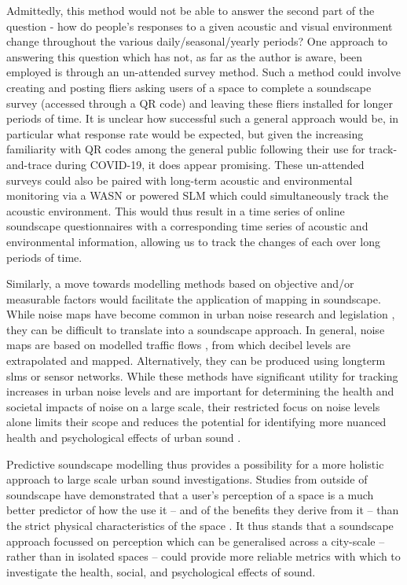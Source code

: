 Admittedly, this method would not be able to answer the second part of the question - how do people's responses to a given acoustic and visual environment change throughout the various daily/seasonal/yearly periods? One approach to answering this question which has not, as far as the author is aware, been employed is through an un-attended survey method. Such a method could involve creating and posting fliers asking users of a space to complete a soundscape survey (accessed through a QR code) and leaving these fliers installed for longer periods of time. It is unclear how successful such a general approach would be, in particular what response rate would be expected, but given the increasing familiarity with QR codes among the general public following their use for track-and-trace during COVID-19, it does appear promising. These un-attended surveys could also be paired with long-term acoustic and environmental monitoring via a WASN or powered SLM which could simultaneously track the acoustic environment. This would thus result in a time series of online soundscape questionnaires with a corresponding time series of acoustic and environmental information, allowing us to track the changes of each over long periods of time.

Similarly, a move towards modelling methods based on objective and/or measurable factors would facilitate the application of mapping in soundscape. While noise maps have become common in urban noise research and legislation \citep{EEA2020Environment} , they can be difficult to translate into a soundscape approach. In general, noise maps are based on modelled traffic flows \cit{}, from which decibel levels are extrapolated and mapped. Alternatively, they can be produced using longterm \glspl{slm} or sensor networks. While these methods have significant utility for tracking increases in urban noise levels and are important for determining the health and societal impacts of noise on a large scale, their restricted focus on noise levels alone limits their scope and reduces the potential for identifying more nuanced health and psychological effects of urban sound .

Predictive soundscape modelling thus provides a possibility for a more holistic approach to large scale urban sound investigations. Studies from outside of soundscape have demonstrated that a user's perception of a space is a much better predictor of how the use it -- and of the benefits they derive from it -- than the strict physical characteristics of the space \citep{Kruize2019Exploring}. It thus stands that a soundscape approach focussed on perception which can be generalised across a city-scale -- rather than in isolated spaces -- could provide more reliable metrics with which to investigate the health, social, and psychological effects of sound.

